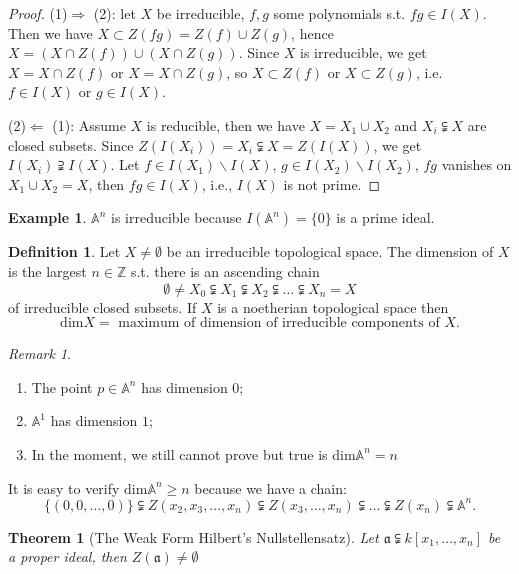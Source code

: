 \documentclass{amsart}
\theoremstyle{plain}
\newtheorem{theorem}{Theorem}
\theoremstyle{definition}
\newtheorem{definition}{Definition}
\newtheorem{example}{Example}
\theoremstyle{remark}
\newtheorem*{remark}{Remark}
\numberwithin{equation}{section}
\begin{document}
\begin{proof}
	(1)$ \Rightarrow $ (2): let $ X $ be irreducible, $ f,g $ some polynomials s.t. $ fg\in I(X) $. Then we have $ X\subset Z(fg)=Z(f)\cup Z(g) $, hence $ X=(X\cap Z(f))\cup (X\cap Z(g)) $. Since $ X $ is irreducible, we get $ X=X\cap Z(f) $ or $ X=X\cap Z(g) $, so $ X\subset Z(f) $ or $ X\subset Z(g) $, i.e. $ f\in I(X) $ or $ g\in I(X) $.
	
	(2)$ \Leftarrow $ (1): Assume $ X $ is reducible, then we have $ X=X_1\cup X_2 $ and $ X_i\subsetneqq X $ are closed subsets.
	Since $ Z(I(X_i))=X_i\subsetneqq X=Z(I(X)) $, we get $ I(X_i)\supsetneqq I(X) $. Let $ f\in I(X_1)\backslash I(X) $, $ g\in I(X_2)\backslash I(X_2) $, $ fg $ vanishes on $ X_1\cup X_2=X $, then $ fg\in I(X) $, i.e., $ I(X) $ is not prime.
\end{proof}
\begin{example}
	$ \mathbb{A}^n $ is irreducible because $ I(\mathbb{A}^n) = \{ 0\} $ is a prime ideal. 
\end{example}
\begin{definition}
	Let $ X\neq \emptyset $ be an irreducible topological space. The dimension of $ X $ is the largest $ n\in\mathbb{Z} $ s.t. there is an ascending chain 
	$$
	\emptyset \neq X_0\subsetneqq X_1\subsetneqq X_2\subsetneqq \dots\subsetneqq X_n=X 
	$$
	of irreducible closed subsets. If $ X $ is a noetherian topological space then
	$$
	\text{dim}X=\text{ maximum of dimension of irreducible components of } X.
	$$ 
\end{definition}
\begin{remark}
	\begin{enumerate}
		\item The point $ p\in\mathbb{A}^n $ has dimension $ 0 $;
		\item $ \mathbb{A}^1 $ has dimension $ 1 $;
		\item In the moment, we still cannot prove but true is $ \text{dim}\mathbb{A}^n=n $
	\end{enumerate}
	It is easy to verify $ \text{dim}\mathbb{A}^n\geq n $ because we have a chain:
	$$
	\{(0,0,\dots,0)\}\subsetneqq Z(x_2,x_3,\dots,x_n)\subsetneqq Z(x_3,\dots,x_n)\subsetneqq\dots\subsetneqq Z(x_n)\subsetneqq \mathbb{A}^n.
	$$
\end{remark}
\begin{theorem}[The Weak Form Hilbert's Nullstellensatz]\label{2}
	Let $ \mathfrak{a}\subsetneqq k[x_1,\dots,x_n] $ be a proper ideal, then $ Z(\mathfrak{a})\neq \emptyset $
\end{theorem}
\end{document}
